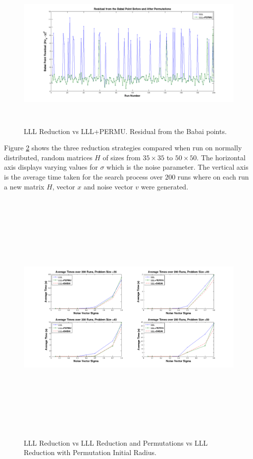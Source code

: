 \documentclass[12pt,Bold,letterpaper]{mcgilletdclass}
\begin{document}
\begin{figure}
\centering
\includegraphics[width=6in,height=3in]{lllvslllpermubabai.png}
\caption{LLL Reduction vs LLL+PERMU. Residual from the Babai points.}
\label{fig:LLLvsPermuBabai}
\end{figure}

Figure \ref{fig:LLLvsPermuvsBabai} shows the three reduction strategies compared when run on normally distributed, random matrices $H$ of sizes from $35 \times 35$ to $50 \times 50$. The horizontal axis displays varying values for $\sigma$ which is the noise parameter. The vertical axis is the average time taken for the search process over $200$ runs where on each run a new matrix $H$, vector $x$ and noise vector $v$ were generated.

\begin{figure}
\centering
\includegraphics[width=6.5in,height=5in]{lllvspermuvsbabai.png}
\caption{LLL Reduction vs LLL Reduction and Permutations vs LLL Reduction with Permutation Initial Radius.}
\label{fig:LLLvsPermuvsBabai}
\end{figure}
\end{document}
